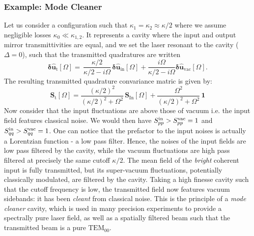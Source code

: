 \subsubsection{Example: Mode Cleaner }
Let us consider a configuration such that $\kappa_1 = \kappa_2 \approx \kappa/2$ where we assume negligible losses $\kappa_0 \ll \kappa_{1,2}$. It represents a cavity where the input and output mirror transmittivities are equal, and we set the laser resonant to the cavity ($\Delta=0$), such that the transmitted quadratures are written
\begin{equation}
  \mathbf{\delta \hat{u}_{\mathrm{t}}}[\Omega]  = \, \dfrac{ \kappa/2}{\kappa/2-i\Omega}  \, \mathbf{\delta \hat{u}_{\mathrm{in}}}[\Omega]   +  \dfrac{i\Omega}{\kappa/2-i\Omega}   \mathbf{\delta \hat{u}_{\mathrm{vac}}}[\Omega] .
\end{equation}
The resulting transmitted quadrature convariance matric is given by: 
\begin{equation}
  \mathbf{S}_{\mathrm{t}}[\Omega] =\frac{(\kappa/2)^2}{(\kappa/2)^2+\Omega^2} \, \mathbf{S}_{\mathrm{In}}[\Omega] +\frac{\Omega^2}{(\kappa/2)^2+\Omega^2}  \,  \mathbf{1}
\end{equation}
Now consider that the input fluctuations are above those of vacuum i.e. the input field features classical noise. We would then have $S_{pp}^{\rm in}> S_{pp}^{\rm vac}=1$ and $S_{qq}^{\rm in}> S_{qq}^{\rm vac}=1$. One can notice that the prefactor to the input noises is actually a Lorentzian function - a low pass filter. Hence, the noises of the input fields are low pass filtered by the cavity, while the vacuum fluctuations are high pass filtered at precisely the same cutoff $\kappa/2$. The mean field of the \textit{bright} coherent input is fully transmitted, but its super-vacuum fluctuations, potentially classically modulated, are filtered by the cavity. Taking a high finesse cavity such that the cutoff frequency is low, the transmitted field now features vacuum sidebands: it has been \textit{cleant} from classical noise. This is the principle of a \textit{mode cleaner} cavity, which is used in many precision experiments to provide a spectrally pure laser field, as well as a spatially filtered beam such that the transmitted beam is a pure $\mathrm{TEM}_{00}$.\\

